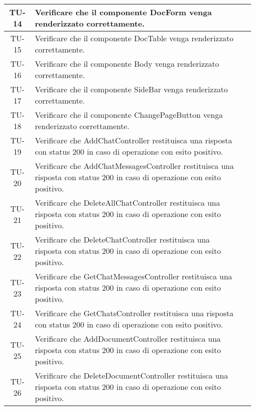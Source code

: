 \begin{xltabular}{\textwidth}{| c | X | c |}
    \hline
    TU-14 & Verificare che il componente DocForm venga renderizzato correttamente. & \textcolor{cmarkcolor}{} \\
    \hline
    TU-15 & Verificare che il componente DocTable venga renderizzato correttamente. & \textcolor{cmarkcolor}{} \\
    \hline
    TU-16 & Verificare che il componente Body venga renderizzato correttamente. & \textcolor{cmarkcolor}{} \\
    \hline
    TU-17 & Verificare che il componente SideBar venga renderizzato correttamente. & \textcolor{cmarkcolor}{} \\
    \hline
    TU-18 & Verificare che il componente ChangePageButton venga renderizzato correttamente. & \textcolor{cmarkcolor}{} \\
    \hline
    TU-19 & Verificare che AddChatController restituisca una risposta con status 200 in caso di operazione con esito positivo. & \textcolor{cmarkcolor}{} \\
    \hline
    TU-20 & Verificare che AddChatMessagesController restituisca una risposta con status 200 in caso di operazione con esito positivo. & \textcolor{cmarkcolor}{} \\
    \hline
    TU-21 & Verificare che DeleteAllChatController restituisca una risposta con status 200 in caso di operazione con esito positivo. & \textcolor{cmarkcolor}{} \\
    \hline
    TU-22 & Verificare che DeleteChatController restituisca una risposta con status 200 in caso di operazione con esito positivo. & \textcolor{cmarkcolor}{}\\
    \hline
    TU-23 & Verificare che GetChatMessagesController restituisca una risposta con status 200 in caso di operazione con esito positivo. & \textcolor{cmarkcolor}{} \\
    \hline
    TU-24 & Verificare che GetChatsController restituisca una risposta con status 200 in caso di operazione con esito positivo. & \textcolor{cmarkcolor}{} \\
    \hline
    TU-25 & Verificare che AddDocumentController restituisca una risposta con status 200 in caso di operazione con esito positivo. & \textcolor{cmarkcolor}{} \\
    \hline
    TU-26 & Verificare che DeleteDocumentController restituisca una risposta con status 200 in caso di operazione con esito positivo. & \textcolor{cmarkcolor}{} \\

\end{xltabular}
